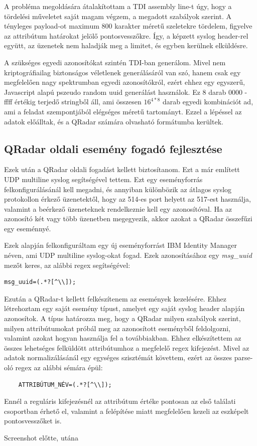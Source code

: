 A probléma megoldására átalakítottam a TDI assembly line-t úgy, hogy a tördelési műveletet saját magam végzem, a megadott szabályok szerint. A tényleges payload-ot maximum 800 karakter méretű szeletekre tördelem, figyelve az attribútum határokat jelölő pontosvesszőkre. Így, a képzett syslog header-rel együtt, az üzenetek nem haladják meg a limitet, és egyben kerülnek elküldésre. 

A szükséges egyedi azonosítókat szintén TDI-ban generálom. Mivel nem kriptográfiailag biztonságos véletlenek generálásáról van szó, hanem csak egy megfelelően nagy spektrumban egyedi azonosítókról, ezért ehhez egy egyszerű, Javascript alapú pszeudo random uuid generálást használok. Ez 8 darab 0000 - ffff értékig terjedő stringből áll, ami összesen $16^{4 * 8} $ darab egyedi kombinációt ad, ami a feladat szempontjából elégséges méretű tartományt. Ezzel a lépéssel az adatok előálltak, és a QRadar számára olvasható formátumba kerültek.


\subsection{QRadar oldali esemény fogadó fejlesztése}

Ezek után a QRadar oldali fogadást kellett biztosítanom. Ezt a már említett UDP multiline syslog segítségével tettem. Ezt egy eseményforrás felkonfigurálásánál kell megadni, és annyiban különbözik az átlagos syslog protokollon érkező üzenetektől, hogy az 514-es port helyett az 517-est használja, valamint a beérkező üzeneteknek rendelkeznie kell egy azonosítóval. Ha az azonosító két vagy több üzenetben megegyezik, akkor azokat a QRadar összefűzi egy eseménnyé.

Ezek alapján felkonfiguráltam egy új eseményforrást IBM Identity Manager néven, ami UDP multiline syslog-okat fogad. Ezek azonosításához egy \textit{msg\_uuid} mezőt keres, az alábbi regex segítségével: 

\begin{lstlisting}
msg_uuid=(.*?[^\\]);
\end{lstlisting}

Ezután a QRadar-t kellett felkészítenem az események kezelésére. Ehhez létrehoztam egy saját esemény típust, amelyet egy saját syslog header alapján azonosítok. A típus határozza meg, hogy a QRadar milyen szabályok szerint, milyen attribútumokat próbál meg az azonosított eseményből feldolgozni, valamint azokat hogyan használja fel a továbbiakban. Ehhez elkészítettem az összes lehetséges felküldött attribútumhoz a megfelelő regex kifejezést. Mivel az adatok normalizálásánál egy egységes szisztémát követtem, ezért az összes parse-oló regex az alábbi sémára épül:

\begin{lstlisting}
	ATTRIBÚTUM_NÉV=(.*?[^\\]);
\end{lstlisting}

Ennél a reguláris kifejezésnél az attribútum értéke pontosan az első találati csoportban érhető el, valamint a felépítése miatt megfelelően kezeli az \todo eszképelt pontosvesszőket is.

\todo Screenshot előtte, utána\\
